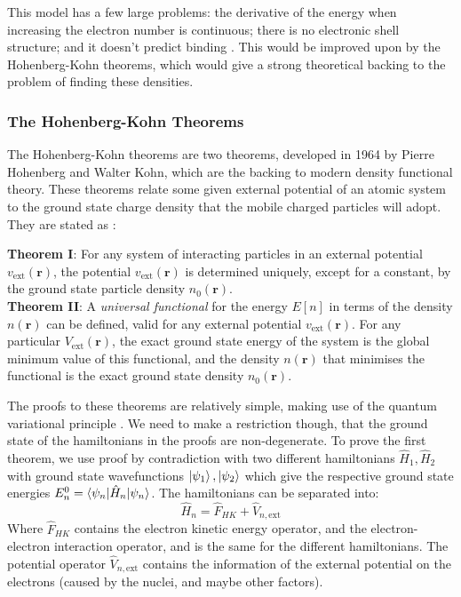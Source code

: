 \documentclass[12pt]{article}
\begin{document}
This model has a few large problems: the derivative of the energy when increasing the electron number is continuous; there is no electronic shell structure; and it doesn't predict binding \cite{lieb1977thomas}. This would be improved upon by the Hohenberg-Kohn theorems, which would give a strong theoretical backing to the problem of finding these densities.
\subsubsection{The Hohenberg-Kohn Theorems}
The Hohenberg-Kohn theorems \cite{PhysRev.136.B864} are two theorems, developed in 1964 by Pierre Hohenberg and Walter Kohn, which are the backing to modern density functional theory. These theorems relate some given external potential of an atomic system to the ground state charge density that the mobile charged particles will adopt. They are stated as \cite{martin_2004}:
\begin{displayquote}
	\textbf{Theorem I}: For any system of interacting particles in an external potential $v_\mathrm{ext}(\mathbf r)$, the potential $v_\mathrm{ext}(\mathbf r)$ is determined uniquely, except for a constant, by the ground state particle density $n_0(\mathbf{r})$.
\\
	\textbf{Theorem II}: A \textit{universal functional} for the energy $E[n]$ in terms of the density $n(\mathbf r)$ can be defined, valid for any external potential $v_\mathrm{ext}(\mathbf r)$.
For any particular $V_\mathrm{ext}(\mathbf r)$, the exact ground state energy of the system is the global minimum value of this functional, and the density $n(\mathbf r)$ that minimises the functional is the exact ground state density $n_0(\mathbf r)$.
\end{displayquote}
The proofs to these theorems are relatively simple, making use of the quantum variational principle \cite{shankar2012principles}. We need to make a restriction though, that the ground state of the hamiltonians in the proofs are non-degenerate.
To prove the first theorem, we use proof by contradiction with two different hamiltonians $\hat H_1, \hat H_2$ with ground state wavefunctions $\ket{\psi_1}, \ket{\psi_2}$ which give the respective ground state energies $E^0_n=\braket{\psi_n | \hat H_n | \psi_n}$. 
The hamiltonians can be separated into:
\begin{equation}
\hat H_n = \hat F_{HK} + \hat V_{n, \mathrm{ext}}
\end{equation}
Where $\hat F_{HK}$ contains the electron kinetic energy operator, and the electron-electron interaction operator, and is the same for the different hamiltonians. The potential operator $\hat V_{n, \mathrm{ext}}$ contains the information of the external potential on the electrons (caused by the nuclei, and maybe other factors).
\end{document}
